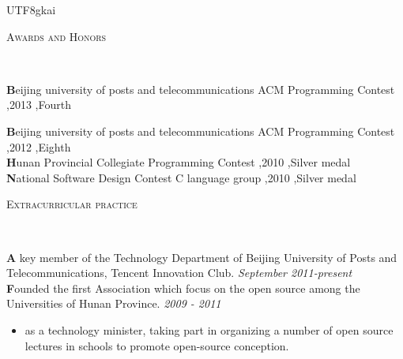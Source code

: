 \documentclass[9pt]{article}
\newenvironment{changemargin}[2]{%
  \begin{list}{}{%
    \setlength{\topsep}{0pt}%
    \setlength{\leftmargin}{#1}%
    \setlength{\rightmargin}{#2}%
    \setlength{\listparindent}{\parindent}%
    \setlength{\itemindent}{\parindent}%
    \setlength{\parsep}{\parskip}%
  }%
  \item[]}{\end{list}
}
\newcommand{\lineover}{
	\begin{changemargin}{-0.05in}{-0.05in}
		\vspace*{-8pt}
		\hrulefill \\
		\vspace*{-2pt}
	\end{changemargin}
}
\newcommand{\header}[1]{
	\begin{changemargin}{-0.5in}{-0.5in}
		\scshape{#1}\\
  	\lineover
	\end{changemargin}
}
\newenvironment{body} {
	\vspace*{-16pt}
	\begin{changemargin}{-0.25in}{-0.5in}
  }	
	{\end{changemargin}
}
\begin{document}
\begin{CJK}{UTF8}{gkai}
\smallskip



\header{Awards and Honors}

\begin{body}
	\vspace{14pt}
	\textbf  Beijing university of posts and telecommunications ACM Programming Contest ,2013 ,Fourth \\
	\smallskip
	
    \textbf  Beijing university of posts and telecommunications ACM Programming Contest ,2012 ,Eighth \\

	\smallskip
	\textbf Hunan Provincial Collegiate Programming Contest ,2010 ,Silver medal \\
	
	\smallskip
	\textbf National Software Design Contest C language group ,2010 ,Silver medal\\
\end{body}


\smallskip





\header{Extracurricular practice}

\begin{body}
	\vspace{14pt}
	\textbf A key member of the Technology Department of Beijing University of Posts and Telecommunications, Tencent Innovation Club.\hfill {} \emph{September 2011-present}\\
	\smallskip
	\textbf Founded the first Association which focus on the open source among the Universities of Hunan Province.   \hfill{} \emph{2009 - 2011}\\
	\vspace*{-4pt}
	\begin{itemize} \itemsep -0pt
		\item as a technology minister, taking part in organizing a number of open source lectures in schools to promote open-source conception.
	\end{itemize}
\end{body}

\smallskip

\smallskip
\end{CJK}
\end{document}
